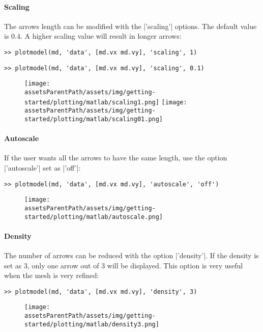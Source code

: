 \paragraph{Scaling}
The arrows length can be modified with the \lstinlinebg|'scaling'| options. The default value is 0.4. A higher scaling value will result in longer arrows:
\begin{lstlisting}
>> plotmodel(md, 'data', [md.vx md.vy], 'scaling', 1)
\end{lstlisting}
\begin{lstlisting}
>> plotmodel(md, 'data', [md.vx md.vy], 'scaling', 0.1)
\end{lstlisting}
\begin{figure}[H]
	\begin{center}
		\texttt{[image: \\assetsParentPath/assets/img/getting-started/plotting/matlab/scaling1.png]}
		\texttt{[image: \\assetsParentPath/assets/img/getting-started/plotting/matlab/scaling01.png]}
	\end{center}
\end{figure}

\paragraph{Autoscale}
If the user wants all the arrows to have the same length, use the option \lstinlinebg|'autoscale'| set as \lstinlinebg|'off'|:
\begin{lstlisting}
>> plotmodel(md, 'data', [md.vx md.vy], 'autoscale', 'off')
\end{lstlisting}
\begin{figure}[H]
	\begin{center}
		\texttt{[image: \\assetsParentPath/assets/img/getting-started/plotting/matlab/autoscale.png]}
	\end{center}
\end{figure}

\paragraph{Density}
The number of arrows can be reduced with the option \lstinlinebg|'density'|. If the density is set as 3, only one arrow out of 3 will be displayed. This option is very useful when the mesh is very refined:
\begin{lstlisting}
>> plotmodel(md, 'data', [md.vx md.vy], 'density', 3)
\end{lstlisting}
\begin{figure}[H]
	\begin{center}
		\texttt{[image: \\assetsParentPath/assets/img/getting-started/plotting/matlab/density3.png]}
	\end{center}
\end{figure}
